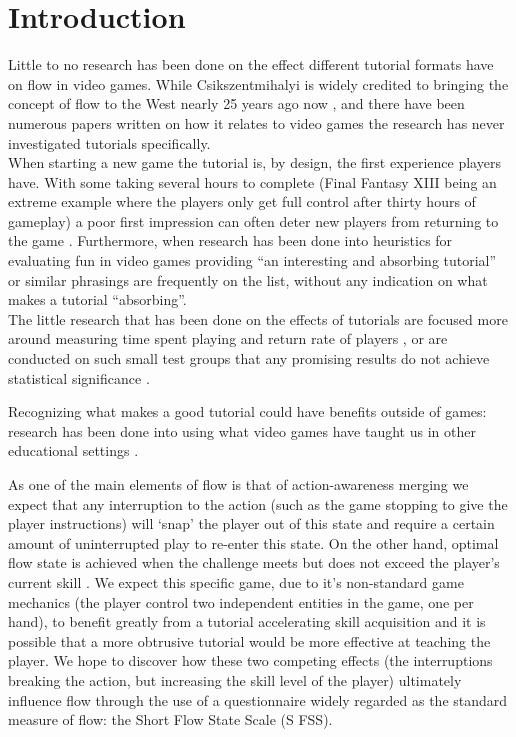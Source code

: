 \documentclass{acmsiggraph}
\begin{document}
\section{Introduction}
Little to no research has been done on the effect different tutorial formats have on flow in video games.
While Csikszentmihalyi is widely credited to bringing the concept of flow to the West  nearly 25 years ago now \cite{optimal}, and there have been numerous papers written on how it relates to video games \cite{flow} the research has never investigated tutorials specifically.\\
When starting a new game the tutorial is, by design, the first experience players have. With some taking several hours to complete (Final Fantasy XIII being an extreme example where the players only get full control after thirty hours of gameplay) a poor first impression can often deter new players from returning to the game \cite{useMMO}. Furthermore, when research has been done into heuristics for evaluating fun in video games providing ``an interesting and absorbing tutorial'' \cite{federoff} or similar phrasings \cite{desurvire} are frequently on the list, without any indication on what makes a tutorial ``absorbing''.\\ 
The little research that has been done on the effects of tutorials are focused more around measuring time spent playing and return rate of players \cite{andersen}, or are conducted on such small test groups that any promising results do not achieve statistical significance \cite{hill}. 

Recognizing what makes a good tutorial could have benefits outside of games: research has been done into using what video games have taught us in other educational settings \cite{videolit}.

As one of the main elements of flow is that of action-awareness merging \cite{jackson} we expect that any interruption to the action (such as the game stopping to give the player instructions) will ‘snap’ the player out of this state and require a certain amount of uninterrupted play to re-enter this state.
On the other hand, optimal flow state is achieved when the challenge meets but does not exceed the player’s current skill \cite{nakamura}. We expect this specific game, due to it’s non-standard game mechanics (the player control two independent entities in the game, one per hand), to benefit greatly from a tutorial accelerating skill acquisition \cite{andersen} and it is possible that a more obtrusive tutorial would be more effective at teaching the player.
We hope to discover how these two competing effects (the interruptions breaking the action, but increasing the skill level of the player) ultimately influence flow through the use of a questionnaire widely regarded as the standard measure of flow: the Short Flow State Scale (S FSS)\cite{jackson}.
\end{document}
